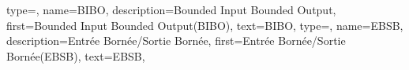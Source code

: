 {%
  type=\acronymtype,%
  name={BIBO},%
  description={Bounded Input Bounded Output},%
  first={\og Bounded Input Bounded Output\fg (BIBO)},%
  text={{\scshape BIBO}},%
}
{%
  type=\acronymtype,%
  name={EBSB},%
  description={Entrée Bornée/Sortie Bornée},%
  first={\og Entrée Bornée/Sortie Bornée\fg (EBSB)},%
  text={{\scshape EBSB}},%
}
